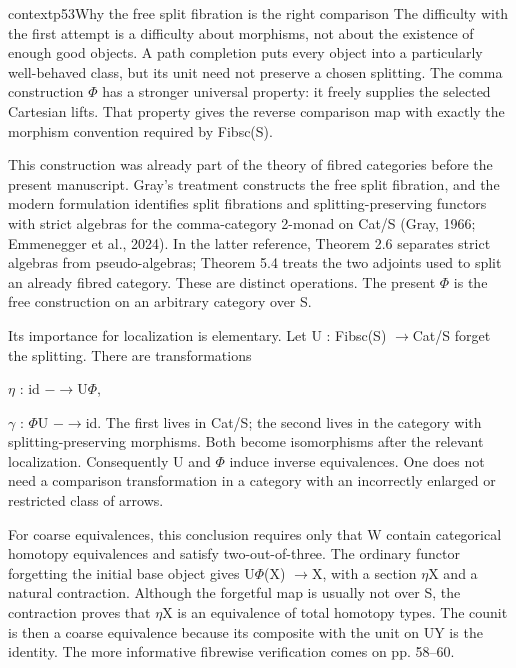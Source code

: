 \begin{dcomment}{context}{p53}{Why the free split fibration is the right comparison}
The difficulty with the first attempt is a difficulty about morphisms, not about the existence of enough good objects. A path completion puts every object into a particularly well-behaved class, but its unit need not preserve a chosen splitting. The comma construction \ensuremath{\Phi} has a stronger universal property: it freely supplies the selected Cartesian lifts. That property gives the reverse comparison map with exactly the morphism convention required by Fibsc(S).

This construction was already part of the theory of fibred categories before the present manuscript. Gray’s treatment constructs the free split fibration, and the modern formulation identifies split fibrations and splitting-preserving functors with strict algebras for the comma-category 2-monad on Cat/S (Gray, 1966; Emmenegger et al., 2024). In the latter reference, Theorem 2.6 separates strict algebras from pseudo-algebras; Theorem 5.4 treats the two adjoints used to split an already fibred category. These are distinct operations. The present \ensuremath{\Phi} is the free construction on an arbitrary category over S.

Its importance for localization is elementary. Let U : Fibsc(S) \ensuremath{\to}Cat/S forget the splitting. There are transformations

\ensuremath{\eta} : id \ensuremath{-}\ensuremath{\to}U\ensuremath{\Phi},

\ensuremath{\gamma} : \ensuremath{\Phi}U \ensuremath{-}\ensuremath{\to}id. The first lives in Cat/S; the second lives in the category with splitting-preserving morphisms. Both become isomorphisms after the relevant localization. Consequently U and \ensuremath{\Phi} induce inverse equivalences. One does not need a comparison transformation in a category with an incorrectly enlarged or restricted class of arrows.

For coarse equivalences, this conclusion requires only that W contain categorical homotopy equivalences and satisfy two-out-of-three. The ordinary functor forgetting the initial base object gives U\ensuremath{\Phi}(X) \ensuremath{\to}X, with a section \ensuremath{\eta}X and a natural contraction. Although the forgetful map is usually not over S, the contraction proves that \ensuremath{\eta}X is an equivalence of total homotopy types. The counit is then a coarse equivalence because its composite with the unit on UY is the identity. The more informative fibrewise verification comes on pp. 58--60.

\end{dcomment}

